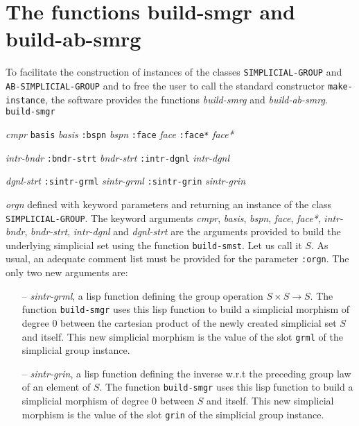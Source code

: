 \section {The functions build-smgr and build-ab-smrg}

To facilitate the construction of instances of 
the classes {\tt SIMPLICIAL-GROUP} and {\tt AB-SIMPLICIAL-GROUP} and to free  the user to call
the standard constructor {\tt make-instance}, the software provides the functions
{\em build-smrg} and {\em build-ab-smrg}. 
\vskip 0.35cm
{\tt build-smgr}\par
\hspace {0.60cm}{\tt :cmpr} {\em cmpr} {\tt basis} {\em basis} {\tt :bspn} {\em bspn} {\tt :face} {\em face}
             {\tt :face*} {\em face*}  \par
\hspace {0.60cm}{\tt :intr-bndr} {\em intr-bndr} {\tt :bndr-strt} {\em bndr-strt} {\tt :intr-dgnl} {\em intr-dgnl} \par
\hspace {0.60cm}{\tt :dgnl-strt} {\em dgnl-strt} {\tt :sintr-grml} {\em sintr-grml} {\tt :sintr-grin} {\em sintr-grin} \par
\hspace {0.60cm}{\tt :orgn} {\em orgn}
\vskip 0.35cm
defined with keyword parameters and returning an instance of the class {\tt SIMPLICIAL-GROUP}.
The keyword arguments {\em cmpr}, {\em basis}, {\em bspn}, {\em face}, {\em face*}, {\em intr-bndr},
{\em bndr-strt}, {\em intr-dgnl} and {\em dgnl-strt} are the arguments provided to build the underlying
simplicial set using the function {\tt build-smst}. Let us call it  $S$.
As usual,  an adequate comment list must be provided for the parameter {\tt :orgn}. The only two new arguments are:
\begin{itemize}
\item[--] {\em sintr-grml}, a  lisp function defining the group operation $S \times S \longrightarrow S$. The function
{\tt build-smgr} uses this lisp function to build a simplicial morphism of degree $0$ between the cartesian product
of the newly created simplicial set $S$ and itself. This new simplicial morphism is the value of the
slot {\tt grml} of the simplicial group instance.
\item[--] {\em sintr-grin}, a  lisp function defining the inverse w.r.t the preceding group law of
an element of $S$. The function 
{\tt build-smgr} uses this lisp function to build a simplicial morphism of degree $0$ between 
$S$ and itself. This new simplicial morphism is the value of the
slot {\tt grin} of the simplicial group instance.
\end{itemize}
